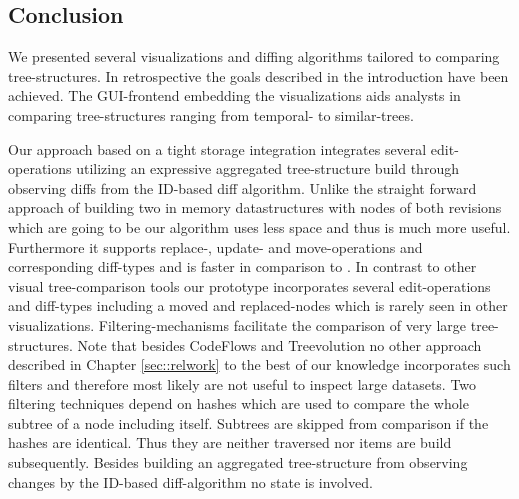 
\subsection{Conclusion}
We presented several visualizations and diffing algorithms tailored to comparing tree-structures. In retrospective the goals described in the introduction have been achieved. The GUI-frontend embedding the visualizations aids analysts in comparing tree-structures ranging from temporal- to similar-trees.

Our approach based on a tight storage integration integrates several edit-operations utilizing an expressive aggregated tree-structure build through observing diffs from the ID-based diff algorithm. Unlike the straight forward approach of building two in memory datastructures with nodes of both revisions which are going to be  our algorithm uses less space and thus is much more useful. Furthermore it supports replace-, update- and move-operations and corresponding diff-types and is faster in comparison to . 
In contrast to other visual tree-comparison tools our prototype incorporates several edit-operations and diff-types including a moved and replaced-nodes which is rarely seen in other visualizations. Filtering-mechanisms facilitate the comparison of very large tree-structures. Note that besides CodeFlows\cite{telea2008code} and Treevolution\cite{theron2006hierarchical} no other approach described in Chapter \ref{sec::relwork} to the best of our knowledge incorporates such filters and therefore most likely are not useful to inspect large datasets. Two filtering techniques depend on hashes which are used to compare the whole subtree of a node including itself. Subtrees are skipped from comparison if the hashes are identical. Thus they are neither traversed nor items are build subsequently. Besides building an aggregated tree-structure from observing changes by the ID-based diff-algorithm no state is involved. 

